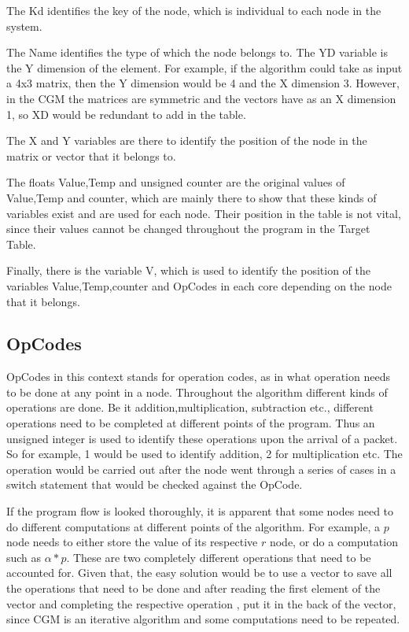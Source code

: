 \documentclass[12pt,a4paper]{article}
\begin{document}
The Kd identifies the key of the node, which is individual to each node in the system. 

The Name identifies the type of which the node belongs to. The YD variable is the Y dimension of the element. For example, if the algorithm could take as input a 4x3 matrix, then the Y dimension would be 4 and the X dimension 3. However, in the CGM the matrices are symmetric and the vectors have as an X dimension 1, so XD would be redundant to add in the table. 

The X and Y variables are there to identify the position of the node in the matrix or vector that it belongs to. 

The floats Value,Temp and unsigned counter are the original values of Value,Temp and counter, which are mainly there to show that these kinds of variables exist and are used for each node. Their position in the table is not vital, since their values cannot be changed throughout the program in the Target Table. 

Finally, there is the variable V, which is used to identify the position of the variables Value,Temp,counter and OpCodes in each core depending on the node that it belongs.
\subsection{OpCodes}
OpCodes in this context stands for operation codes, as in what operation needs to be done at any point in a node. Throughout the algorithm different kinds of operations are done. Be it addition,multiplication, subtraction etc., different operations need to be completed at different points of the program. Thus an unsigned integer is used to identify these operations upon the arrival of a packet. So for example, 1 would be used to identify addition, 2 for multiplication etc. The operation would be carried out after the node went through a series of cases in a switch statement that would be checked against the OpCode.

If the program flow is looked thoroughly, it is apparent that some nodes need to do different computations at different points of the algorithm. For example, a $p$ node needs to either store the value of its respective $r$ node, or do a computation such as $\alpha *p$. These are two completely different operations that need to be accounted for. Given that, the easy solution would be to use a vector to save all the operations that need to be done and after reading the first element of the vector and completing the respective operation , put it in the back of the vector, since CGM is an iterative algorithm and some computations need to be repeated.
\end{document}
